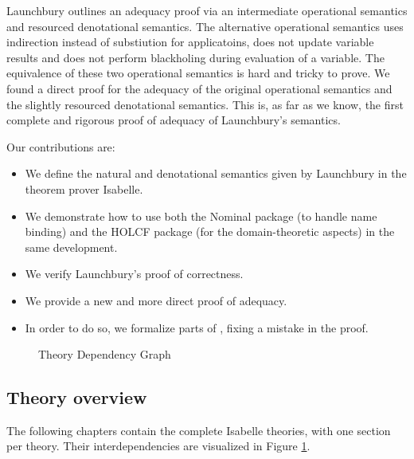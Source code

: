 \documentclass[11pt,a4paper,parskip=half]{scrartcl}
\begin{document}
Launchbury outlines an adequacy proof via an intermediate operational semantics and resourced denotational semantics. The alternative operational semantics  uses indirection instead of substiution for applicatoins, does not update variable results and does not perform blackholing during evaluation of a variable. The equivalence of these two operational semantics is hard and tricky to prove. We found a direct proof for the adequacy of the original operational semantics and the slightly resourced denotational semantics. This is, as far as we know, the first complete and rigorous proof of adequacy of Launchbury's semantics.

Our contributions are:
\begin{itemize}
\item We define the natural and denotational semantics given by Launchbury in the theorem prover Isabelle.
\item We demonstrate how to use both the Nominal package (to handle name binding) \cite{nominal} and the HOLCF \cite{holcf} package (for the domain-theoretic aspects) in the same development.
\item We verify Launchbury's proof of correctness.
\item We provide a new and more direct proof of adequacy.
\item In order to do so, we formalize parts of \cite{functionspaces}, fixing a mistake in the proof.
\end{itemize}

%




\begin{figure}
\begin{center}
\end{center}
\caption{Theory Dependency Graph\label{theory-deps}}
\end{figure}

\subsection{Theory overview}

The following chapters contain the complete Isabelle theories, with one section per theory. Their interdependencies are visualized in Figure \ref{theory-deps}.
\end{document}
